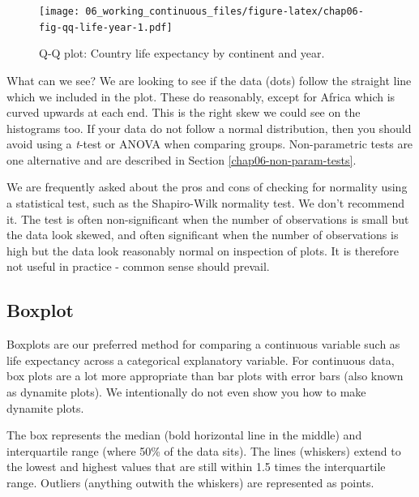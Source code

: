 \documentclass[
  12pt,
  krantz2]{krantz}
\begin{document}
\begin{figure}
\centering
\texttt{[image: 06\_working\_continuous\_files/figure-latex/chap06-fig-qq-life-year-1.pdf]}
\caption{\label{fig:chap06-fig-qq-life-year}Q-Q plot: Country life expectancy by continent and year.}
\end{figure}


What can we see?
We are looking to see if the data (dots) follow the straight line which we included in the plot.
These do reasonably, except for Africa which is curved upwards at each end.
This is the right skew we could see on the histograms too.
If your data do not follow a normal distribution, then you should avoid using a \emph{t}-test or ANOVA when comparing groups.
Non-parametric tests are one alternative and are described in Section \ref{chap06-non-param-tests}.

We are frequently asked about the pros and cons of checking for normality using a statistical test, such as the Shapiro-Wilk normality test.
We don't recommend it.
The test is often non-significant when the number of observations is small but the data look skewed, and often significant when the number of observations is high but the data look reasonably normal on inspection of plots.
It is therefore not useful in practice - common sense should prevail.

\hypertarget{boxplot}{%
\subsection{Boxplot}\label{boxplot}}


Boxplots are our preferred method for comparing a continuous variable such as life expectancy across a categorical explanatory variable.
For continuous data, box plots are a lot more appropriate than bar plots with error bars (also known as dynamite plots).
We intentionally do not even show you how to make dynamite plots.

The box represents the median (bold horizontal line in the middle) and interquartile range (where 50\% of the data sits).
The lines (whiskers) extend to the lowest and highest values that are still within 1.5 times the interquartile range.
Outliers (anything outwith the whiskers) are represented as points.
\end{document}
